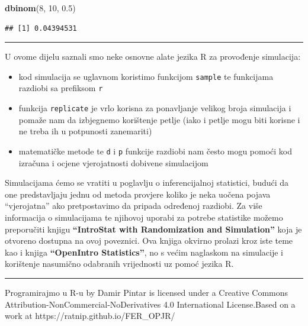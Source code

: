 \documentclass[]{book}
\newenvironment{Shaded}{\begin{snugshade}}{\end{snugshade}}
\newcommand{\KeywordTok}[1]{\textcolor[rgb]{0.13,0.29,0.53}{\textbf{#1}}}
\newcommand{\DecValTok}[1]{\textcolor[rgb]{0.00,0.00,0.81}{#1}}
\newcommand{\FloatTok}[1]{\textcolor[rgb]{0.00,0.00,0.81}{#1}}
\newcommand{\NormalTok}[1]{#1}
\providecommand{\tightlist}{%
  \setlength{\itemsep}{0pt}\setlength{\parskip}{0pt}}
\theoremstyle{definition}
\theoremstyle{definition}
\theoremstyle{definition}
\theoremstyle{remark}
\begin{document}
\begin{Shaded}
\begin{Highlighting}[]
\KeywordTok{dbinom}\NormalTok{(}\DecValTok{8}\NormalTok{, }\DecValTok{10}\NormalTok{, }\FloatTok{0.5}\NormalTok{)}
\end{Highlighting}
\end{Shaded}

\begin{verbatim}
## [1] 0.04394531
\end{verbatim}

\begin{center}\rule{0.5\linewidth}{\linethickness}\end{center}

U ovome dijelu saznali smo neke osnovne alate jezika R za provođenje
simulacija:

\begin{itemize}
\tightlist
\item
  kod simulacija se uglavnom koristimo funkcijom \texttt{sample} te
  funkcijama razdiobi sa prefiksom \texttt{r}
\item
  funkcija \texttt{replicate} je vrlo korisna za ponavljanje velikog
  broja simulacija i pomaže nam da izbjegnemo korištenje petlje (iako i
  petlje mogu biti korisne i ne treba ih u potpunosti zanemariti)
\item
  matematičke metode te \texttt{d} i \texttt{p} funkcije razdiobi nam
  često mogu pomoći kod izračuna i ocjene vjerojatnosti dobivene
  simulacijom
\end{itemize}

Simulacijama ćemo se vratiti u poglavlju o inferencijalnoj statistici,
budući da one predstavljaju jednu od metoda provjere koliko je neka
uočena pojava ``vjerojatna'' ako pretpostavimo da pripada određenoj
razdiobi. Za više informacija o simulacijama te njihovoj uporabi za
potrebe statistike možemo preporučiti knjigu \textbf{``IntroStat with
Randomization and Simulation''} koja je otvoreno dostupna na ovoj
poveznici. Ova knjiga okvirno prolazi kroz iste teme kao i knjiga
\textbf{``OpenIntro Statistics''}, no s većim naglaskom na simulacije i
korištenje nasumično odabranih vrijednosti uz pomoć jezika R.

\begin{center}\rule{0.5\linewidth}{\linethickness}\end{center}

{Programirajmo u R-u} by Damir Pintar is licensed under a Creative
Commons Attribution-NonCommercial-NoDerivatives 4.0 International
License.Based on a work at https://ratnip.github.io/FER\_OPJR/
\end{document}
